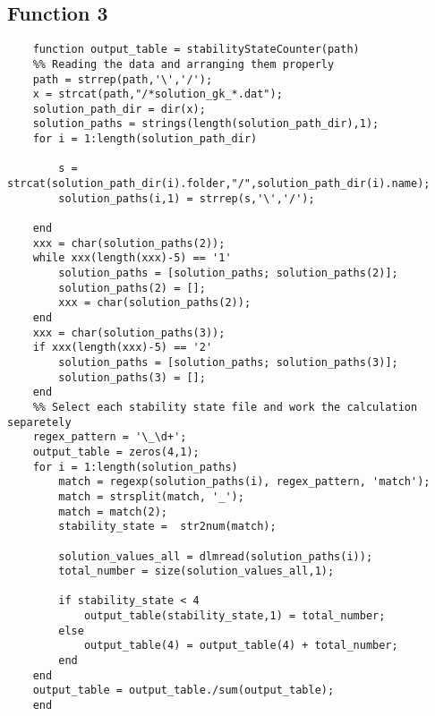 \documentclass{article}
\begin{document}
\subsection*{Function 3}
\begin{verbatim}
    function output_table = stabilityStateCounter(path)
    %% Reading the data and arranging them properly
    path = strrep(path,'\','/');
    x = strcat(path,"/*solution_gk_*.dat");
    solution_path_dir = dir(x);
    solution_paths = strings(length(solution_path_dir),1);
    for i = 1:length(solution_path_dir)
        
        s = strcat(solution_path_dir(i).folder,"/",solution_path_dir(i).name);
        solution_paths(i,1) = strrep(s,'\','/');
        
    end
    xxx = char(solution_paths(2));
    while xxx(length(xxx)-5) == '1'
        solution_paths = [solution_paths; solution_paths(2)];
        solution_paths(2) = [];
        xxx = char(solution_paths(2));
    end
    xxx = char(solution_paths(3));
    if xxx(length(xxx)-5) == '2'
        solution_paths = [solution_paths; solution_paths(3)];
        solution_paths(3) = [];
    end
    %% Select each stability state file and work the calculation separetely
    regex_pattern = '\_\d+';
    output_table = zeros(4,1);
    for i = 1:length(solution_paths)
        match = regexp(solution_paths(i), regex_pattern, 'match');
        match = strsplit(match, '_');
        match = match(2);
        stability_state =  str2num(match);
        
        solution_values_all = dlmread(solution_paths(i));
        total_number = size(solution_values_all,1);
        
        if stability_state < 4
            output_table(stability_state,1) = total_number;
        else
            output_table(4) = output_table(4) + total_number;
        end
    end
    output_table = output_table./sum(output_table);
    end    
\end{verbatim}
\end{document}
